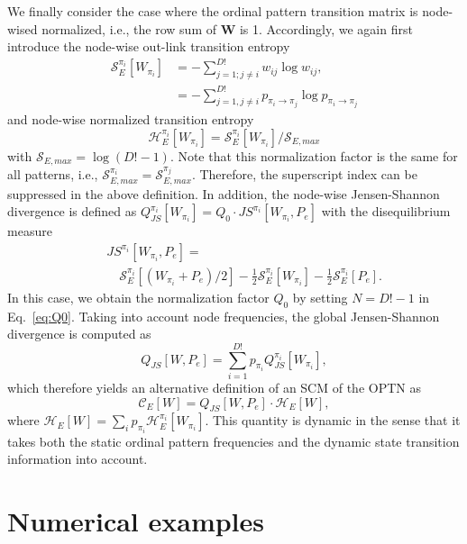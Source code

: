 \documentclass[12pt,aip,cha,reprint,nofootinbib]{revtex4-1}
\begin{document}
We finally consider the case where the ordinal pattern transition matrix is node-wised normalized, i.e., the row sum of $\mathbf{W}$ is 1. Accordingly, we again first introduce the node-wise out-link transition entropy
\begin{equation}
\begin{split}
\mathcal{S}_{E}^{\pi_i}[W_{\pi_i}] &= - \sum_{j = 1; j \neq i}^{D!} w_{ij} \log w_{ij},  \\ 
&= - \sum_{j=1, j \neq i}^{D!} p_{\pi_i \to \pi_j} \log p_{\pi_i \to \pi_j} 
\end{split}
\end{equation}
and node-wise normalized transition entropy
\begin{equation}
\mathcal{H}_{E}^{\pi_i}[W_{\pi_i}] = \mathcal{S}_{E}^{\pi_i}[W_{\pi_i}] / \mathcal{S}_{E, max} 
\end{equation}
with $\mathcal{S}_{E, max} = \log (D! - 1)$. Note that this normalization factor is the same for all patterns, i.e., $\mathcal{S}_{E, max}^{\pi_i} = \mathcal{S}_{E, max}^{\pi_j}$. Therefore, the superscript index can be suppressed in the above definition. In addition, the node-wise Jensen-Shannon divergence is defined as $Q_{JS}^{\pi_i}[W_{\pi_i}] = Q_0 \cdot JS^{\pi_i} [W_{\pi_i}, P_e]$ with the disequilibrium measure
\begin{eqnarray}
&&JS^{\pi_i} [W_{\pi_i}, P_e] = \nonumber \\
&&\quad \mathcal{S}_{E}^{\pi_i}[(W_{\pi_i} + P_e)/2] - \frac{1}{2}\mathcal{S}_{E}^{\pi_i}[W_{\pi_i}] - \frac{1}{2}\mathcal{S}_{E}^{\pi_i}[P_e]. 
\end{eqnarray}
In this case, we obtain the normalization factor $Q_0$ by setting $N = D! - 1$ in Eq.~\eqref{eq:Q0}. Taking into account node frequencies, the global Jensen-Shannon divergence is computed as 
\begin{equation}
Q_{JS}[W, P_e] = \sum_{i=1}^{D!} p_{\pi_i} Q_{JS}^{\pi_i}[W_{\pi_i}], 
\end{equation}
which therefore yields an alternative definition of an SCM of the OPTN as 
\begin{equation}
\mathcal{C}_{E}[W] = Q_{JS}[W, P_e] \cdot \mathcal{H}_{E}[W], 
\end{equation}
where $\mathcal{H}_{E}[W] = \sum_{i} p_{\pi_i} \mathcal{H}_{E}^{\pi_i}[W_{\pi_i}]$. This quantity is dynamic in the sense that it takes both the static ordinal pattern frequencies and the dynamic state transition information into account. 

\section{Numerical examples}\label{sec:results1}
\end{document}
